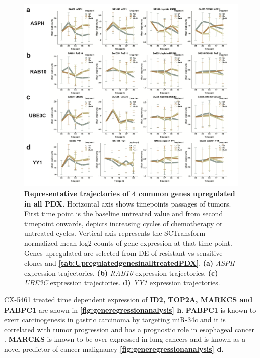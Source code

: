 \begin{figure}
\centering
  \includegraphics[width=\textwidth]{Figures/chap5/commongenesfromvolcanoplots.png}
	
\caption[Representative trajectories of 4 common genes upregulated in all PDX]
	{\small
	\textbf{Representative trajectories of 4 common genes upregulated in all PDX.}
	   Horizontal axis shows timepoints passages of tumors. First time point is the baseline untreated value and from second timepoint onwards, depicts increasing cycles of chemotherapy or untreated cycles. Vertical axis represents the SCTransform normalized mean log2 counts of gene expression at that time point. Genes upregulated are selected from \ac{DE} of resistant vs sensitive clones and \textbf{\autoref{tab:UpregulatedgenesinalltreatedPDX}}.
	   \textbf{(a)} \textit{ASPH} expression trajectories.
	    \textbf{(b)} \textit{RAB10} expression trajectories.
	    \textbf{(c)} \textit{UBE3C} expression trajectories.
	     \textbf{d)} \textit{YY1} expression trajectories.
	}
	\label{fig:commongenesfromvolcanoplots}
\end{figure}

CX-5461 treated time dependent expression of \textbf{ID2, TOP2A, MARKCS and PABPC1} are shown in \textbf{\autoref{fig:generegressionanalysis} h}.
\textbf{PABPC1} is known to exert carcinogenesis in gastric carcinoma by targeting miR-34c and it is correlated with tumor progression and has a prognostic role in esophageal cancer \cite{zhu2015pabpc1,takashima2006expression}. \textbf{MARCKS} is known to be over expressed in lung cancers and is known as a novel predictor of cancer malignancy \cite{reddy2014marcks, chen2014novel} \textbf{\autoref{fig:generegressionanalysis} d.}

